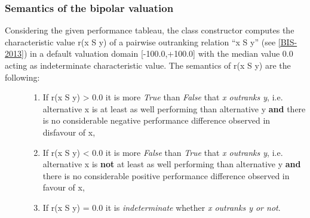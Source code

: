 \documentclass[letterpaper,10pt,english]{sphinxmanual}
\begin{document}
\subsubsection{Semantics of the bipolar valuation}
\label{tutorial:semantics-of-the-bipolar-valuation}\begin{description}
\item[{Considering the given performance tableau, the  class constructor computes the characteristic value r(x S y) of a pairwise outranking relation ``x S y'' (see {\hyperref[tutorial:bis-2013]{{[}BIS-2013{]}}}) in a default valuation domain {[}-100.0,+100.0{]} with the median value 0.0 acting as indeterminate characteristic value. The semantics of r(x S y) are the following:}] \leavevmode\begin{enumerate}
\item {} 
If r(x S y) \textgreater{} 0.0 it is more \emph{True} than \emph{False} that \emph{x outranks y}, i.e. alternative x is at least as well performing than alternative y \textbf{and} there is no considerable negative performance difference observed in disfavour of x,

\item {} 
If r(x S y) \textless{} 0.0 it is more \emph{False} than \emph{True} that \emph{x outranks y}, i.e. alternative x is \textbf{not} at least as well performing than alternative y \textbf{and} there is no considerable positive performance difference observed in favour of x,

\item {} 
If r(x S y) = 0.0 it is \emph{indeterminate} whether \emph{x outranks y or not}.

\end{enumerate}


\end{description}
\end{document}
